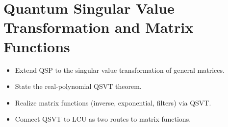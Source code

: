 \chapter{Quantum Singular Value Transformation and Matrix Functions}
\label{ch:lec09}

\begin{objectives}
\begin{itemize}[leftmargin=1.4em,nosep]
  \item Extend QSP to the singular value transformation of general matrices.
  \item State the real-polynomial QSVT theorem.
  \item Realize matrix functions (inverse, exponential, filters) via QSVT.
  \item Connect QSVT to LCU as two routes to matrix functions.
\end{itemize}
\end{objectives}

